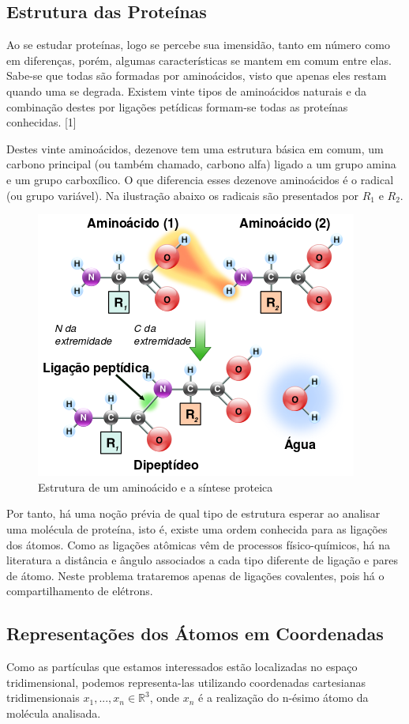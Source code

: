\documentclass[a4paper,12pt]{article}
\begin{document}
	\subsection{Estrutura das Proteínas}
	Ao se estudar proteínas, logo se percebe sua imensidão, tanto em número como em diferenças, porém, algumas características se mantem em comum entre elas. Sabe-se que todas são formadas por aminoácidos, visto que apenas eles restam quando uma se degrada. Existem vinte tipos de aminoácidos naturais e da combinação destes por ligações petídicas formam-se todas as proteínas conhecidas. [1]
	
	Destes vinte aminoácidos, dezenove tem uma estrutura básica em comum, um carbono principal (ou também chamado, carbono alfa) ligado a um grupo amina e um grupo carboxílico. O que diferencia esses dezenove aminoácidos é o radical (ou grupo variável). Na ilustração abaixo os radicais são presentados por $R_1$ e $R_2$.
	\\
	\begin{figure}[H]
		\begin{center}
			\includegraphics[width=0.6\linewidth]{Peptidformation.png}
		\end{center}
		\caption{Estrutura de um aminoácido e a síntese proteica}
		\label{}
	\end{figure}
	
	Por tanto, há uma noção prévia de qual tipo de estrutura esperar ao analisar uma molécula de proteína, isto é, existe uma ordem conhecida para as ligações dos átomos. Como as ligações atômicas vêm de processos físico-químicos, há na literatura a distância e ângulo associados a cada tipo diferente de ligação e pares de átomo. Neste problema trataremos apenas de ligações covalentes, pois há o compartilhamento de elétrons.
	
	\subsection{Representações dos Átomos em Coordenadas}
	Como as partículas que estamos interessados estão localizadas no espaço tridimensional, podemos representa-las utilizando coordenadas cartesianas tridimensionais $x_1, ...,x_n \in\mathbb{R}^3$, onde $x_n$ é a realização do n-ésimo átomo da molécula analisada. 
	
\end{document}
